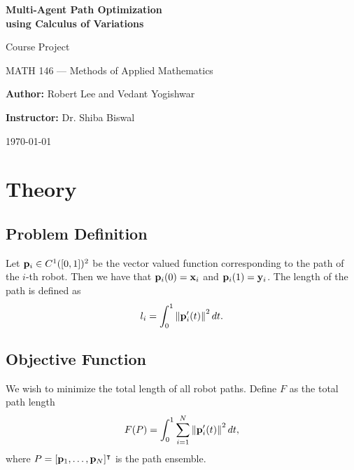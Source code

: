 \documentclass[11pt]{article}
\begin{document}
\begin{titlepage}
    \centering
    \null
    
    {\huge \textbf{Multi-Agent Path Optimization\\using Calculus of Variations}\par}
    \vspace{5mm}
    {\Large \large Course Project\par
    MATH 146 --- Methods of Applied Mathematics\par}
    \vspace{5mm}
    {\large \textbf{Author:} Robert Lee and Vedant Yogishwar\par
    \textbf{Instructor:} Dr. Shiba Biswal\par}
    
    
    {\large \today\par}
\end{titlepage}

\clearpage

\tableofcontents

\clearpage

\printunsrtglossary[type=symbols,style=long,title={List of Symbols}]

\section{Theory}

\subsection{Problem Definition}

Let \(\mathbf{p}_i \in C^1([0,1])^2\) be the vector valued function corresponding to the path of the \(i\)-th robot. Then we have that \(\mathbf{p}_i(0) = \mathbf{x}_i\) and \(\mathbf{p}_i(1) = \mathbf{y}_i\). The length of the path is defined as
\begin{equation}
    l_i = \int_0^1 \left\lVert \mathbf{p}_i'(t) \right\rVert^2 dt.
\end{equation}

\subsection{Objective Function}

We wish to minimize the total length of all robot paths. Define \(F\) as the total path length
\begin{equation}
    F(P) = \int_0^1 \sum_{i=1}^{N} \left\lVert \mathbf{p}_i'(t) \right\rVert^2 dt,
\end{equation}
where \(P = [\mathbf{p}_1, \ldots, \mathbf{p}_N]^\intercal\) is the path ensemble.
\end{document}
